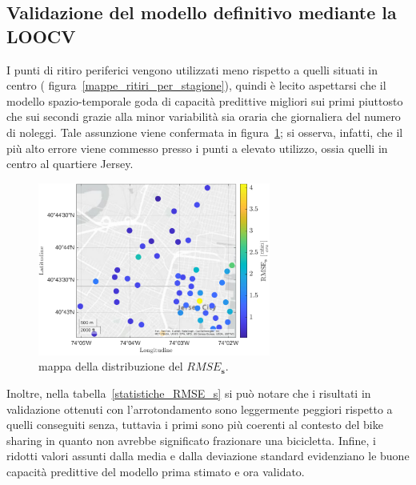 \subsection{Validazione del modello definitivo mediante la LOOCV}
I punti di ritiro periferici vengono utilizzati meno rispetto a quelli situati in centro ( figura~\ref{mappe_ritiri_per_stagione}),  quindi è lecito aspettarsi che il modello spazio-temporale goda di capacità predittive migliori sui primi piuttosto che sui secondi grazie alla minor variabilità sia oraria che giornaliera del numero di noleggi. Tale assunzione viene confermata in figura~\ref{mappa_RMSE_s}; si osserva, infatti, che il più alto errore viene commesso presso i punti a elevato utilizzo, ossia quelli in centro al quartiere Jersey.

\begin{figure}[htpb]
	\centering
	\includegraphics[height=215px]{Immagini/4. Caso di studio/LOOCV/RMSE_s}
	\caption[Mappa della distribuzione del $RMSE_\mathbf{s}$]{mappa della distribuzione del $RMSE_\mathbf{s}$.}
	\label{mappa_RMSE_s}
\end{figure}

Inoltre, nella tabella~\ref{statistiche_RMSE_s} si può notare che i risultati in validazione ottenuti con l'arrotondamento sono leggermente peggiori rispetto a quelli conseguiti senza, tuttavia i primi sono più coerenti al contesto del bike sharing in quanto non avrebbe significato frazionare una bicicletta. Infine, i ridotti valori assunti dalla media e dalla deviazione standard evidenziano le buone capacità predittive del modello prima stimato e ora validato.

